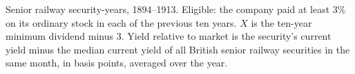 Senior railway security-years, 1894--1913. Eligible: the company paid at least 3\% on its ordinary stock in each of the previous ten years. $X$ is the ten-year minimum dividend minus 3. Yield relative to market is the security's current yield minus the median current yield of all British senior railway securities in the same month, in basis points, averaged over the year.
